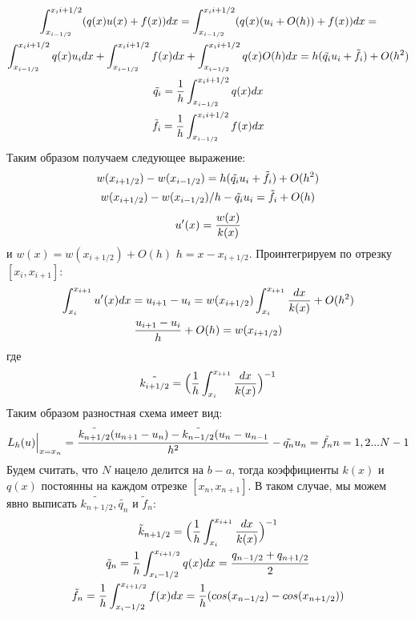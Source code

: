 \documentclass[titlepage]{article}
\begin{document}
\begin{gather}
	\notag \int_{x_{i - 1/2}}^{x_i{i + 1/2}}(q(x)u(x) + f(x))dx = \int_{x_{i - 1/2}}^{x_i{i + 1/2}}(q(x)(u_i + O(h)) + f(x))dx =\\
	\notag \int_{x_{i - 1/2}}^{x_i{i + 1/2}}q(x)u_idx + \int_{x_{i - 1/2}}^{x_i{i + 1/2}}f(x)dx + \int_{x_{i - 1/2}}^{x_i{i + 1/2}}q(x)O(h)dx = h(\tilde{q_i}u_i + \tilde{f_i}) + O(h^2) \\
	\tilde{q_i} = \frac{1}{h}\int_{x_{i - 1/2}}^{x_i{i + 1/2}}q(x)dx \\
	\tilde{f_i} = \frac{1}{h}\int_{x_{i - 1/2}}^{x_i{i + 1/2}}f(x)dx
\end{gather}
Таким образом получаем следующее выражение:
\begin{gather}
	\notag w(x_{i + 1/2}) - w(x_{i - 1/2}) = h(\tilde{q_i}u_i + \tilde{f_i}) + O(h^2)\\
	\notag w(x_{i + 1/2}) - w(x_{i - 1/2})/h  - \tilde{q_i}u_i = \tilde{f_i}  + O(h)
\end{gather}
\begin{gather}
	\notag u'(x) = \frac{w(x)}{k(x)}
\end{gather}
и $w(x) = w(x_{i + 1/2}) + O(h)$ $h = x - x_{i + 1/2}$. Проинтегрируем по отрезку $[x_i,x_{i + 1}]$:
\begin{gather}
	\notag \int_{x_i}^{x_{i + 1}}u'(x)dx = u_{i + 1} - u_i = w(x_{i + 1/2})\int_{x_i}^{x_{i + 1}}\frac{dx}{k(x)} + O(h^2)\\
	\notag \frac{u_{i + 1} - u_{i}}{h} + O(h) = w(x_{i + 1/2})
\end{gather}
где
\begin{gather}
	\notag \tilde{k_{i + 1/2}} = \Big(\frac{1}{h}\int_{x_i}^{x_{i + 1}}\frac{dx}{k(x)}\Big)^{-1}
\end{gather}
Таким образом разностная схема имеет вид:
\begin{gather}
	\notag L_{h}(u)\Big|_{x=x_n} = \frac{\tilde{k_{n + 1/2}}(u_{n + 1} - u_n) - \tilde{k_{n - 1/2}}(u_n - u_{n - 1}}{h^2} - \tilde{q_n}u_n = \tilde{f_n} n = 1, 2...N - 1
\end{gather}
Будем считать, что $N$ нацело делится на $b-a$, тогда коэффициенты $k(x)$ и $q(x)$ постоянны на каждом отрезке $[x_n, x_{n+1}]$. В таком случае, мы можем явно выписать $\tilde{k_{n + 1/2}}, \tilde{q_n} $ и $\tilde f_n$:
\begin{gather}
	\notag \tilde{k}_{n + 1/2} = \Big(\frac{1}{h}\int_{x_i}^{x_{i + 1}}\frac{dx}{k(x)}\Big)^{-1} \\
	\notag \tilde{q}_{n} = \frac{1}{h}\int_{x_i - 1/2}^{x_{i + 1/2}}q(x)dx = \frac{q_{n - 1/2} + q_{n + 1/2}}{2} \\
	\notag \tilde{f}_n = \frac{1}{h}\int_{x_i - 1/2}^{x_{i + 1/2}}f(x)dx= 		\notag \frac{1}{h}(cos(x_{n - 1/2}) - cos(x_{n + 1/2}))
\end{gather}
\end{document}

